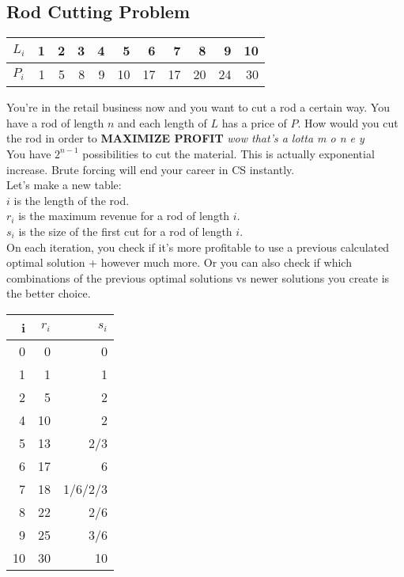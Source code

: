 \documentclass{article}
\begin{document}
\subsection{Rod Cutting Problem}
\label{sec:org15d0148}
\begin{center}
\begin{tabular}{lrrrrrrrrrr}
\(L_i\) & 1 & 2 & 3 & 4 & 5 & 6 & 7 & 8 & 9 & 10\\
\hline
\(P_i\) & 1 & 5 & 8 & 9 & 10 & 17 & 17 & 20 & 24 & 30\\
\end{tabular}
\end{center}
You're in the retail business now and you want to cut a rod a certain way. You have a rod of length \(n\) and each length of \(L\) has a price of \(P\). How would you cut the rod in order to \textbf{MAXIMIZE PROFIT} \emph{wow that's a lotta m o n e y} \\
You have \(2^{n-1}\) possibilities to cut the material. This is actually exponential increase. Brute forcing will end your career in CS instantly. \\

Let's make a new table:\\
\(i\) is the length of the rod.\\
\(r_i\) is the maximum revenue for a rod of length \(i\).\\
\(s_i\) is the size of the first cut for a rod of length \(i\).\\
On each iteration, you check if it's more profitable to use a previous calculated optimal solution + however much more. Or you can also check if which combinations of the previous optimal solutions vs newer solutions you create is the better choice.

\begin{center}
\begin{tabular}{rrr}
i & \(r_i\) & \(s_i\)\\
\hline
0 & 0 & 0\\
1 & 1 & 1\\
2 & 5 & 2\\
4 & 10 & 2\\
5 & 13 & 2/3\\
6 & 17 & 6\\
7 & 18 & 1/6/2/3\\
8 & 22 & 2/6\\
9 & 25 & 3/6\\
10 & 30 & 10\\
\end{tabular}
\end{center}
\end{document}
